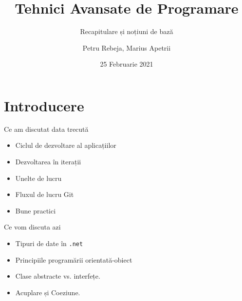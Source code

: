 \documentclass[presentation]{beamer}
\author{Petru Rebeja, Marius Apetrii}
\date{25 Februarie 2021}
\title{Tehnici Avansate de Programare}
\subtitle{Recapitulare și noțiuni de bază}
\institute[UAIC]{Facultatea de Matematică\\Universitatea Alexandru Ioan Cuza, Iași}
\begin{document}
\maketitle
\section{Introducere}
\label{sec:orge19cf5a}
\begin{frame}[label={sec:orge6140ac}]{Ce am discutat data trecută}
\pause
\begin{itemize}
\item Ciclul de dezvoltare al aplicațiilor
\item Dezvoltarea în iterații
\item Unelte de lucru
\item Fluxul de lucru Git
\item Bune practici
\end{itemize}
\end{frame}
\begin{frame}[label={sec:orgcd17fb4},fragile]{Ce vom discuta azi}
 \begin{itemize}
\item Tipuri de date în \texttt{.net}
\item Principiile programării orientată-obiect
\item Clase abstracte vs. interfețe.
\item Acuplare și Coeziune.
\end{itemize}
\end{frame}
\end{document}
